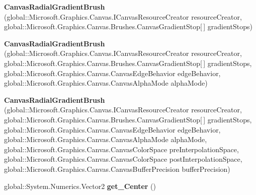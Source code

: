 \begin{DoxyCompactItemize}
{\bfseries Canvas\+Radial\+Gradient\+Brush} (global\+::\+Microsoft.\+Graphics.\+Canvas.\+I\+Canvas\+Resource\+Creator resource\+Creator, global\+::\+Microsoft.\+Graphics.\+Canvas.\+Brushes.\+Canvas\+Gradient\+Stop\mbox{[}$\,$\mbox{]} gradient\+Stops)
\item 
\mbox{\label{class_microsoft_1_1_graphics_1_1_canvas_1_1_brushes_1_1_canvas_radial_gradient_brush_a72a997087b68baa682963acf4c7547b0}} 
{\bfseries Canvas\+Radial\+Gradient\+Brush} (global\+::\+Microsoft.\+Graphics.\+Canvas.\+I\+Canvas\+Resource\+Creator resource\+Creator, global\+::\+Microsoft.\+Graphics.\+Canvas.\+Brushes.\+Canvas\+Gradient\+Stop\mbox{[}$\,$\mbox{]} gradient\+Stops, global\+::\+Microsoft.\+Graphics.\+Canvas.\+Canvas\+Edge\+Behavior edge\+Behavior, global\+::\+Microsoft.\+Graphics.\+Canvas.\+Canvas\+Alpha\+Mode alpha\+Mode)
\item 
\mbox{\label{class_microsoft_1_1_graphics_1_1_canvas_1_1_brushes_1_1_canvas_radial_gradient_brush_a5bcd11137c2799ca1ee5edea427d5ecb}} 
{\bfseries Canvas\+Radial\+Gradient\+Brush} (global\+::\+Microsoft.\+Graphics.\+Canvas.\+I\+Canvas\+Resource\+Creator resource\+Creator, global\+::\+Microsoft.\+Graphics.\+Canvas.\+Brushes.\+Canvas\+Gradient\+Stop\mbox{[}$\,$\mbox{]} gradient\+Stops, global\+::\+Microsoft.\+Graphics.\+Canvas.\+Canvas\+Edge\+Behavior edge\+Behavior, global\+::\+Microsoft.\+Graphics.\+Canvas.\+Canvas\+Alpha\+Mode alpha\+Mode, global\+::\+Microsoft.\+Graphics.\+Canvas.\+Canvas\+Color\+Space pre\+Interpolation\+Space, global\+::\+Microsoft.\+Graphics.\+Canvas.\+Canvas\+Color\+Space post\+Interpolation\+Space, global\+::\+Microsoft.\+Graphics.\+Canvas.\+Canvas\+Buffer\+Precision buffer\+Precision)
\item 
\mbox{\label{class_microsoft_1_1_graphics_1_1_canvas_1_1_brushes_1_1_canvas_radial_gradient_brush_a43413929c2a98e600a2c1dbe5ca5bd5d}} 
global\+::\+System.\+Numerics.\+Vector2 {\bfseries get\+\_\+\+Center} ()
\item 
\mbox{\label{class_microsoft_1_1_graphics_1_1_canvas_1_1_brushes_1_1_canvas_radial_gradient_brush_a8fb60dbea8079a04d895966bf57a6cd4}} 

\end{DoxyCompactItemize}
